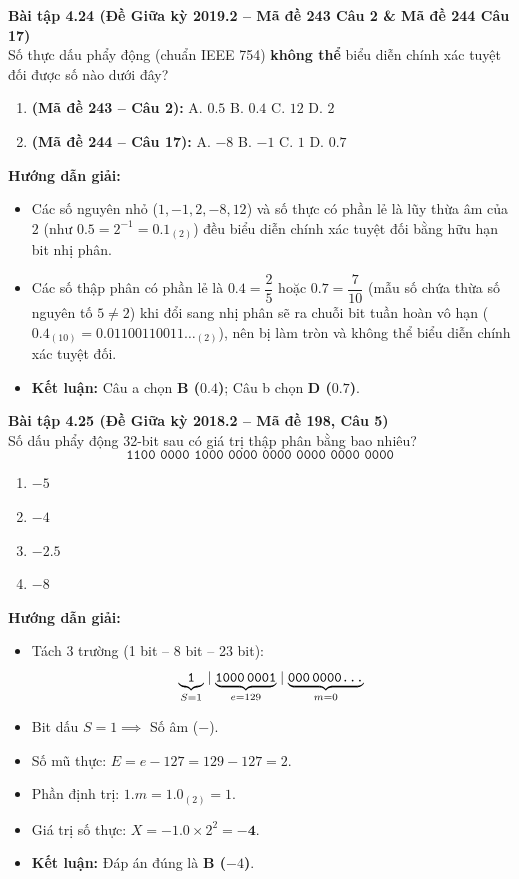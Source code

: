 \textbf{Bài tập 4.24 (Đề Giữa kỳ 2019.2 -- Mã đề 243 Câu 2 \& Mã đề 244 Câu 17)}\\
Số thực dấu phẩy động (chuẩn IEEE 754) \textbf{không thể} biểu diễn chính xác tuyệt đối được số nào dưới đây?
\begin{enumerate}[label=\alph*)]
    \item \textbf{(Mã đề 243 -- Câu 2):} A. $0.5$ \qquad B. $0.4$ \qquad C. $12$ \qquad D. $2$
    \item \textbf{(Mã đề 244 -- Câu 17):} A. $-8$ \qquad B. $-1$ \qquad C. $1$ \qquad D. $0.7$
\end{enumerate}
\textbf{Hướng dẫn giải:}
\begin{itemize}
    \item Các số nguyên nhỏ ($1, -1, 2, -8, 12$) và số thực có phần lẻ là lũy thừa âm của $2$ (như $0.5 = 2^{-1} = 0.1_{(2)}$) đều biểu diễn chính xác tuyệt đối bằng hữu hạn bit nhị phân.
    \item Các số thập phân có phần lẻ là $0.4 = \dfrac{2}{5}$ hoặc $0.7 = \dfrac{7}{10}$ (mẫu số chứa thừa số nguyên tố $5 \neq 2$) khi đổi sang nhị phân sẽ ra chuỗi bit tuần hoàn vô hạn ($0.4_{(10)} = 0.01100110011\dots_{(2)}$), nên bị làm tròn và không thể biểu diễn chính xác tuyệt đối.
    \item \textbf{Kết luận:} Câu a chọn \textbf{B ($0.4$)}; Câu b chọn \textbf{D ($0.7$)}.
\end{itemize}

\textbf{Bài tập 4.25 (Đề Giữa kỳ 2018.2 -- Mã đề 198, Câu 5)}\\
Số dấu phẩy động 32-bit sau có giá trị thập phân bằng bao nhiêu?
$$\texttt{1100 0000 1000 0000 0000 0000 0000 0000}$$
\begin{enumerate}[label=\Alph*.]
    \item $-5$
    \item $-4$
    \item $-2.5$
    \item $-8$
\end{enumerate}
\textbf{Hướng dẫn giải:}
\begin{itemize}
    \item Tách 3 trường (1 bit -- 8 bit -- 23 bit):
    $$\underbrace{\texttt{1}}_{S=1} \mid \underbrace{\texttt{1000\,0001}}_{e=129} \mid \underbrace{\texttt{000\,0000\dots}}_{m=0}$$
    \item Bit dấu $S = 1 \implies$ Số âm ($-$).
    \item Số mũ thực: $E = e - 127 = 129 - 127 = 2$.
    \item Phần định trị: $1.m = 1.0_{(2)} = 1$.
    \item Giá trị số thực: $X = -1.0 \times 2^2 = \mathbf{-4}$.
    \item \textbf{Kết luận:} Đáp án đúng là \textbf{B ($-4$)}.
\end{itemize}

